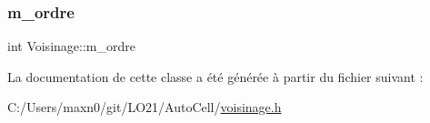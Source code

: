\subsubsection{\texorpdfstring{m\+\_\+ordre}{m\_ordre}}
{\footnotesize\ttfamily int Voisinage\+::m\+\_\+ordre\hspace{0.3cm}{\ttfamily [protected]}}



La documentation de cette classe a été générée à partir du fichier suivant \+:\begin{DoxyCompactItemize}
\item 
C\+:/\+Users/maxn0/git/\+L\+O21/\+Auto\+Cell/\mbox{\hyperlink{voisinage_8h}{voisinage.\+h}}\end{DoxyCompactItemize}
